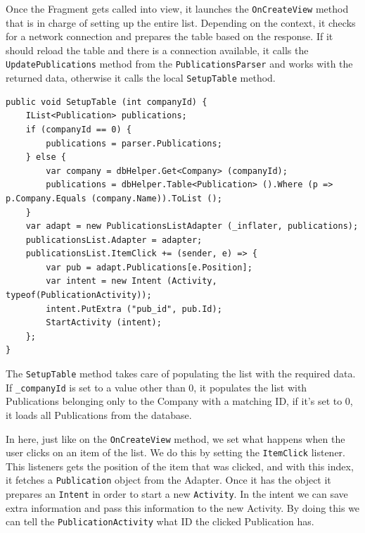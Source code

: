 Once the Fragment gets called into view, it launches the \texttt{OnCreateView} method that is in charge of setting up the entire list. Depending on the context, it checks for a network connection and prepares the table based on the response. If it should reload the table and there is a connection available, it calls the \texttt{UpdatePublications} method from the \texttt{PublicationsParser} and works with the returned data, otherwise it calls the local \texttt{SetupTable} method.

\begin{lstlisting}[frame=lt,caption=SetupTable, label={list:pub_setup}]
public void SetupTable (int companyId) {
	IList<Publication> publications;
	if (companyId == 0) {
		publications = parser.Publications;
	} else {
		var company = dbHelper.Get<Company> (companyId);
		publications = dbHelper.Table<Publication> ().Where (p => p.Company.Equals (company.Name)).ToList ();
	}
	var adapt = new PublicationsListAdapter (_inflater, publications); 
	publicationsList.Adapter = adapter;
	publicationsList.ItemClick += (sender, e) => {
		var pub = adapt.Publications[e.Position];
		var intent = new Intent (Activity, typeof(PublicationActivity));
		intent.PutExtra ("pub_id", pub.Id);
		StartActivity (intent);
	};
}
\end{lstlisting}


The \texttt{SetupTable} method takes care of populating the list with the required data. If \texttt{\_companyId} is set to a value other than 0, it populates the list with Publications belonging only to the Company with a matching ID, if it's set to 0, it loads all Publications from the database.

In here, just like on the \texttt{OnCreateView} method, we set what happens when the user clicks on an item of the list. We do this by setting the \texttt{ItemClick} listener. This listeners gets the position of the item that was clicked, and with this index, it fetches a \texttt{Publication} object from the Adapter. Once it has the object it prepares an \texttt{Intent} in order to start a new \texttt{Activity}. In the intent we can save extra information and pass this information to the new Activity. By doing this we can tell the \texttt{PublicationActivity} what ID the clicked Publication has.\\
\newline


